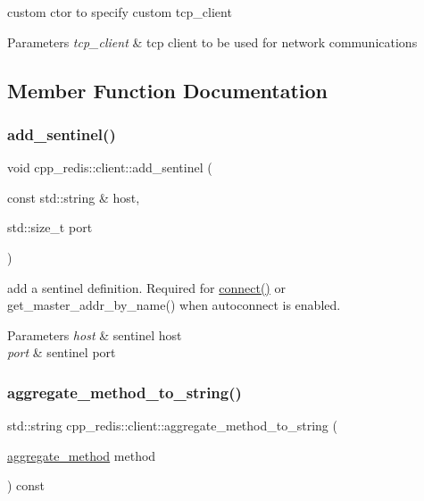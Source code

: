 custom ctor to specify custom tcp\+\_\+client


\begin{DoxyParams}{Parameters}
{\em tcp\+\_\+client} & tcp client to be used for network communications \\
\hline
\end{DoxyParams}


\subsection{Member Function Documentation}
\mbox{\label{classcpp__redis_1_1client_a7050eb52856decad9ab2060a139f4b48}} 
\subsubsection{\texorpdfstring{add\+\_\+sentinel()}{add\_sentinel()}}
{\footnotesize\ttfamily void cpp\+\_\+redis\+::client\+::add\+\_\+sentinel (\begin{DoxyParamCaption}\item[{const std\+::string \&}]{host,  }\item[{std\+::size\+\_\+t}]{port }\end{DoxyParamCaption})}

add a sentinel definition. Required for \hyperlink{classcpp__redis_1_1client_adda8b3e7b4f9c80ac052753b39178dd5}{connect()} or get\+\_\+master\+\_\+addr\+\_\+by\+\_\+name() when autoconnect is enabled.


\begin{DoxyParams}{Parameters}
{\em host} & sentinel host \\
\hline
{\em port} & sentinel port \\
\hline
\end{DoxyParams}
\mbox{\label{classcpp__redis_1_1client_accc567df4dd23b30defdd9605719e0ca}} 
\subsubsection{\texorpdfstring{aggregate\+\_\+method\+\_\+to\+\_\+string()}{aggregate\_method\_to\_string()}}
{\footnotesize\ttfamily std\+::string cpp\+\_\+redis\+::client\+::aggregate\+\_\+method\+\_\+to\+\_\+string (\begin{DoxyParamCaption}\item[{\hyperlink{classcpp__redis_1_1client_aa197ca5b36da793c701d3ba388ec4946}{aggregate\+\_\+method}}]{method }\end{DoxyParamCaption}) const}

